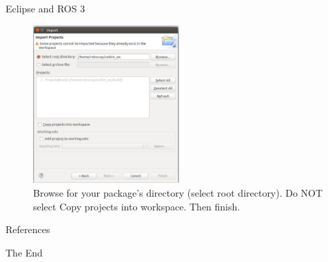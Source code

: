\documentclass{beamer}
\begin{document}
\begin{frame}{Eclipse and ROS 3}

\begin{figure}
	\centering
  \includegraphics[width=0.50\textwidth]{./images/file.pdf}
	\caption{Browse for your package's directory (select root directory). Do NOT select Copy projects into workspace. Then finish.}
	\label{fig1}
\end{figure}

\end{frame}
\begin{frame}[allowframebreaks]{References}
\scriptsize{}
\end{frame}
\begin{frame}
\Huge{\centerline{The End}}
\end{frame}
\end{document}
